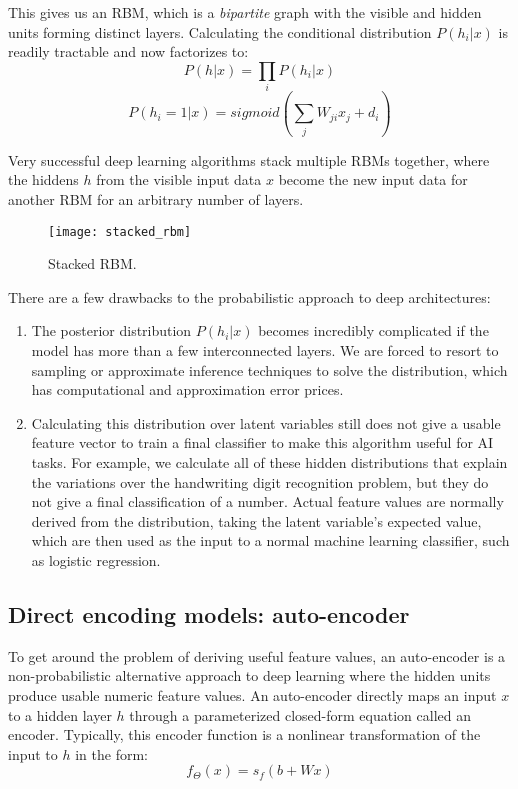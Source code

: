 This gives us an RBM, which is a \emph{bipartite} graph with the visible and hidden units forming distinct layers. Calculating the conditional distribution \(P(h_i | x)\) is readily tractable and now factorizes to: 
\[P(h | x) = \prod_i P(h_i | x)\]
\[P(h_i = 1 | x) = sigmoid \left( \sum_j W_{ji} x_j + d_i \right)\]

Very successful deep learning algorithms stack multiple RBMs together, where the hiddens \(h\) from the visible input data \(x\) become the new input data for another RBM for an arbitrary number of layers. 

\begin{figure}[h!]
  \centering
    \texttt{[image: stacked\_rbm]}
\caption{Stacked RBM.}
\end{figure}

There are a few drawbacks to the probabilistic approach to deep architectures:
\begin{enumerate}
\item The posterior distribution \(P(h_i | x)\) becomes incredibly complicated if the model has more than a few interconnected layers. We are forced to resort to sampling or approximate inference techniques to solve the distribution, which has computational and approximation error prices.
\item Calculating this distribution over latent variables still does not give a usable feature vector to train a final classifier to make this algorithm useful for AI tasks. For example, we calculate all of these hidden distributions that explain the variations over the handwriting digit recognition problem, but they do not give a final classification of a number. Actual feature values are normally derived from the distribution, taking the latent variable's expected value, which are then used as the input to a normal machine learning classifier, such as logistic regression.
\end{enumerate}

\subsection{Direct encoding models: auto-encoder}
To get around the problem of deriving useful feature values, an auto-encoder is a non-probabilistic alternative approach to deep learning where the hidden units produce usable numeric feature values. An auto-encoder directly maps an input \(x\) to a hidden layer \(h\) through a parameterized closed-form equation called an encoder. Typically, this encoder function is a nonlinear transformation of the input to \(h\) in the form:
\[f_\Theta (x) = s_f (b + Wx)\]

